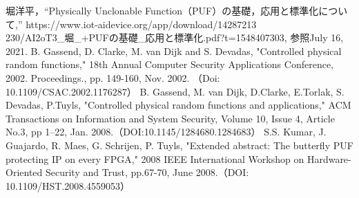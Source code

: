 \documentclass[technicalreport]{ieicej} %
\begin{document}
\begin{thebibliography}{99}
  堀洋平，“Physically Unclonable Function（PUF）の基礎，応用と標準化について,” https://www.iot-aidevice.org/app/download/14287213\\
  230/AI2oT3\_堀\_+PUFの基礎\_応用と標準化.pdf?t=1548407303,
  参照July 16, 2021.
  B. Gassend, D. Clarke, M. van Dijk and S. Devadas, "Controlled physical random functions,"
  18th Annual Computer Security Applications Conference, 2002. Proceedings.,
  pp. 149-160, Nov. 2002. （Doi: 10.1109/CSAC.2002.1176287）
  B. Gassend, M. van Dijk, D.Clarke, E.Torlak, S. Devadas, P.Tuyls,
  "Controlled physical random functions and applications,"
  ACM Transactions on Information and System Security, Volume 10, Issue 4, Article No.3, pp 1–22,
  Jan. 2008.（DOI:10.1145/1284680.1284683）
  S.S. Kumar, J. Guajardo, R. Maes, G. Schrijen, P. Tuyls,
  "Extended abstract: The butterfly PUF protecting IP on every FPGA,"
  2008 IEEE International Workshop on Hardware-Oriented Security and Trust, pp.67-70,
  June 2008.（DOI: 10.1109/HST.2008.4559053）
\end{thebibliography}


\end{document}

